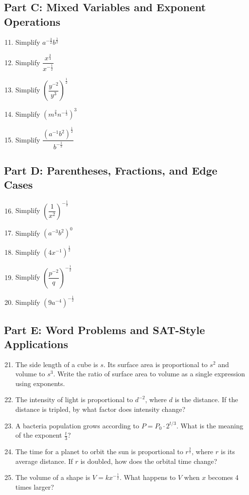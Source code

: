 \documentclass[12pt]{article}
\begin{document}
\subsection*{Part C: Mixed Variables and Exponent Operations}
\begin{enumerate}
  \setcounter{enumi}{10}
  \item Simplify \(a^{-\frac{3}{2}}b^{\frac{1}{2}}\)
  \item Simplify \(\dfrac{x^{\frac{3}{4}}}{x^{-\frac{1}{2}}}\)
  \item Simplify \(\left(\dfrac{y^{-2}}{y^3}\right)^{\frac{1}{2}}\)
  \item Simplify \((m^{\frac{2}{3}}n^{-\frac{1}{3}})^3\)
  \item Simplify \(\dfrac{(a^{-1}b^{2})^{\frac{1}{2}}}{b^{-\frac{1}{2}}}\)
\end{enumerate}

\subsection*{Part D: Parentheses, Fractions, and Edge Cases}
\begin{enumerate}
  \setcounter{enumi}{15}
  \item Simplify \(\left(\dfrac{1}{x^2}\right)^{-\frac{1}{2}}\)
  \item Simplify \((a^{-3}b^2)^0\)
  \item Simplify \((4x^{-1})^{\frac{1}{2}}\)
  \item Simplify \(\left(\dfrac{p^{-2}}{q}\right)^{-\frac{1}{2}}\)
  \item Simplify \((9a^{-4})^{-\frac{1}{2}}\)
\end{enumerate}

\subsection*{Part E: Word Problems and SAT-Style Applications}
\begin{enumerate}
  \setcounter{enumi}{20}
  \item The side length of a cube is \(s\). Its surface area is proportional to \(s^2\) and volume to \(s^3\). Write the ratio of surface area to volume as a single expression using exponents.
  \item The intensity of light is proportional to \(d^{-2}\), where \(d\) is the distance. If the distance is tripled, by what factor does intensity change?
  \item A bacteria population grows according to \(P = P_0 \cdot 2^{t/3}\). What is the meaning of the exponent \(\frac{t}{3}\)?
  \item The time for a planet to orbit the sun is proportional to \(r^{\frac{3}{2}}\), where \(r\) is its average distance. If \(r\) is doubled, how does the orbital time change?
  \item The volume of a shape is \(V = kx^{-\frac{1}{2}}\). What happens to \(V\) when \(x\) becomes 4 times larger?
\end{enumerate}
\end{document}
